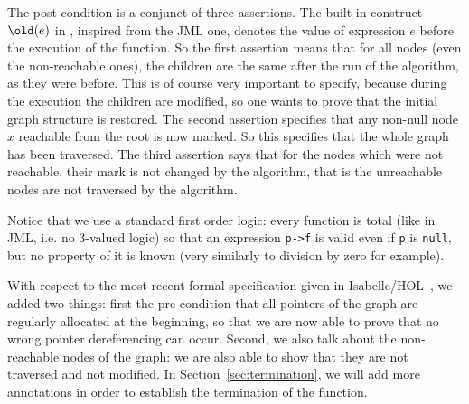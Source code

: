 The post-condition is a conjunct of three assertions. The built-in
construct $\old(e)$ in \caduceus{}, inspired from the JML one, denotes
the value of expression $e$ before the execution of the function. So
the first assertion means that for all nodes (even the non-reachable
ones), the children are the same after the run of the algorithm, as
they were before. This is of course very important to specify, because
during the execution the children are modified, so one wants to prove
that the initial graph structure is restored. The second
assertion specifies that any non-null node $x$ reachable from the
root is now marked. So this specifies that the whole 
graph has been traversed. The third assertion says that for the nodes
which were not reachable, their mark is not changed by the algorithm,
that is the unreachable nodes are not traversed by the algorithm.

Notice that we use a standard first order logic: every function is
total (like in JML, i.e. no 3-valued logic) so that an expression
\verb|p->f| is valid even if \verb|p| is \verb|null|, but no
property of it is known (very similarly to division by zero for
example). 

With respect to the most recent formal specification given in
Isabelle/HOL~\cite{mehta03cade}, we added two things: first the
pre-condition that all pointers of the graph are regularly
allocated at the beginning, so that we are now able to prove that no
wrong pointer dereferencing can occur. Second, we also talk about the
non-reachable nodes of the graph: we are also able to show that they
are not traversed and not modified. In Section~\ref{sec:termination},
we will add more annotations in order to establish the termination of the
function.


